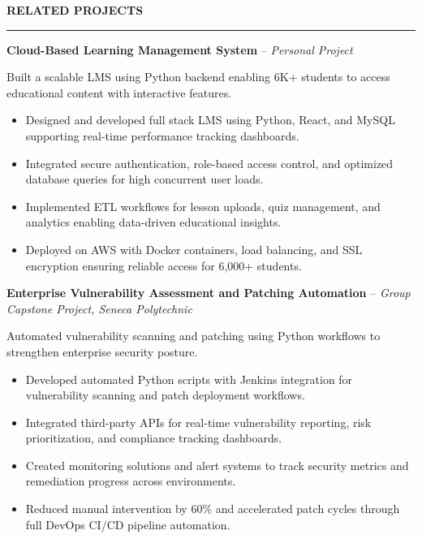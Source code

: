 \documentclass[10pt,letterpaper]{article}
\begin{document}
\vspace{6pt}

\textbf{RELATED PROJECTS}\\[-8pt]
\noindent\rule{\textwidth}{1pt}

\vspace{-2pt}

\textbf{Cloud-Based Learning Management System} -- \emph{Personal Project}

\vspace{-1pt}

Built a scalable LMS using Python backend enabling 6K+ students to access educational content with interactive features.
\vspace{-1pt}
\begin{itemize}
\item Designed and developed full stack LMS using Python, React, and MySQL supporting real-time performance tracking dashboards.
\item Integrated secure authentication, role-based access control, and optimized database queries for high concurrent user loads.
\item Implemented ETL workflows for lesson uploads, quiz management, and analytics enabling data-driven educational insights.
\item Deployed on AWS with Docker containers, load balancing, and SSL encryption ensuring reliable access for 6,000+ students.
\end{itemize}

\textbf{Enterprise Vulnerability Assessment and Patching Automation} -- \emph{Group Capstone Project, Seneca Polytechnic}

\vspace{-1pt}

Automated vulnerability scanning and patching using Python workflows to strengthen enterprise security posture.
\vspace{-1pt}
\begin{itemize}
\item Developed automated Python scripts with Jenkins integration for vulnerability scanning and patch deployment workflows.
\item Integrated third-party APIs for real-time vulnerability reporting, risk prioritization, and compliance tracking dashboards.
\item Created monitoring solutions and alert systems to track security metrics and remediation progress across environments.
\item Reduced manual intervention by 60\% and accelerated patch cycles through full DevOps CI/CD pipeline automation.
\end{itemize}
\end{document}
